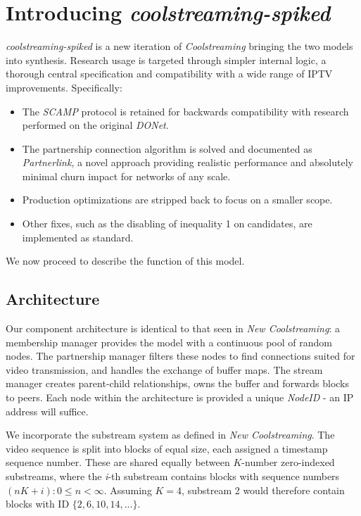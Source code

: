 \documentclass[12pt,a4paper]{article}
\begin{document}
\section{Introducing \textit{coolstreaming-spiked}} \label{css}
\textit{coolstreaming-spiked} is a new iteration of \textit{Coolstreaming} bringing the two models into synthesis. Research usage is targeted through simpler internal logic, a thorough central specification and compatibility with a wide range of IPTV improvements. Specifically:

\begin{itemize}
	\item The \textit{SCAMP} protocol is retained for backwards compatibility with research performed on the original \textit{DONet}.
	\item The partnership connection algorithm is solved and documented as \textit{Partnerlink}, a novel approach providing realistic performance and absolutely minimal churn impact for networks of any scale.
	\item Production optimizations are stripped back to focus on a smaller scope.
	\item Other fixes, such as the disabling of inequality 1 on candidates, are implemented as standard.
\end{itemize}

We now proceed to describe the function of this model.

\subsection{Architecture} \label{css:architecture}
Our component architecture is identical to that seen in \textit{New Coolstreaming}: a membership manager provides the model with a continuous pool of random nodes. The partnership manager filters these nodes to find connections suited for video transmission, and handles the exchange of buffer maps. The stream manager creates parent-child relationships, owns the buffer and forwards blocks to peers. Each node within the architecture is provided a unique \textit{NodeID} - an IP address will suffice.

We incorporate the substream system as defined in \textit{New Coolstreaming}. The video sequence is split into blocks of equal size, each assigned a timestamp sequence number. These are shared equally between \(K\)-number zero-indexed substreams, where the \textit{i}-th substream contains blocks with sequence numbers \((nK + \textit{i}) : 0 \leq n < \infty\). Assuming \(K = 4\), substream 2 would therefore contain blocks with ID \(\{2, 6, 10, 14, ...\}\).
\end{document}
